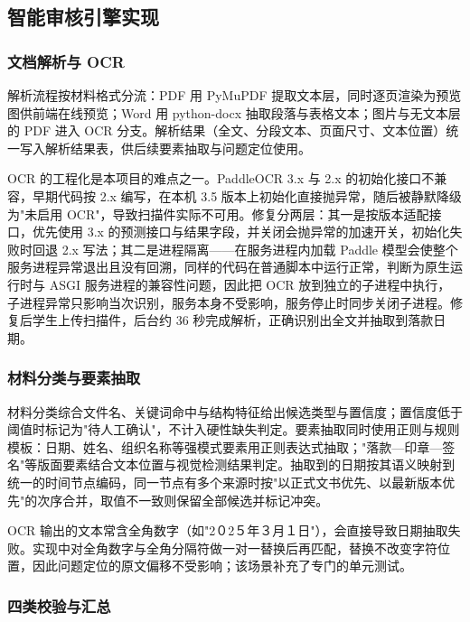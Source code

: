 \documentclass[12pt,a4paper]{ctexart}
\begin{document}
\subsection{智能审核引擎实现}

\subsubsection{文档解析与 OCR}

解析流程按材料格式分流：PDF 用 PyMuPDF 提取文本层，同时逐页渲染为预览图供前端在线预览；Word 用 python-docx 抽取段落与表格文本；图片与无文本层的 PDF 进入 OCR 分支。解析结果（全文、分段文本、页面尺寸、文本位置）统一写入解析结果表，供后续要素抽取与问题定位使用。

OCR 的工程化是本项目的难点之一。PaddleOCR 3.x 与 2.x 的初始化接口不兼容，早期代码按 2.x 编写，在本机 3.5 版本上初始化直接抛异常，随后被静默降级为"未启用 OCR"，导致扫描件实际不可用。修复分两层：其一是按版本适配接口，优先使用 3.x 的预测接口与结果字段，并关闭会抛异常的加速开关，初始化失败时回退 2.x 写法；其二是进程隔离——在服务进程内加载 Paddle 模型会使整个服务进程异常退出且没有回溯，同样的代码在普通脚本中运行正常，判断为原生运行时与 ASGI 服务进程的兼容性问题，因此把 OCR 放到独立的子进程中执行，子进程异常只影响当次识别，服务本身不受影响，服务停止时同步关闭子进程。修复后学生上传扫描件，后台约 36 秒完成解析，正确识别出全文并抽取到落款日期。

\subsubsection{材料分类与要素抽取}

材料分类综合文件名、关键词命中与结构特征给出候选类型与置信度；置信度低于阈值时标记为"待人工确认"，不计入硬性缺失判定。要素抽取同时使用正则与规则模板：日期、姓名、组织名称等强模式要素用正则表达式抽取；"落款—印章—签名"等版面要素结合文本位置与视觉检测结果判定。抽取到的日期按其语义映射到统一的时间节点编码，同一节点有多个来源时按"以正式文书优先、以最新版本优先"的次序合并，取值不一致则保留全部候选并标记冲突。

OCR 输出的文本常含全角数字（如"2０2５年３月１日"），会直接导致日期抽取失败。实现中对全角数字与全角分隔符做一对一替换后再匹配，替换不改变字符位置，因此问题定位的原文偏移不受影响；该场景补充了专门的单元测试。

\subsubsection{四类校验与汇总}
\end{document}
